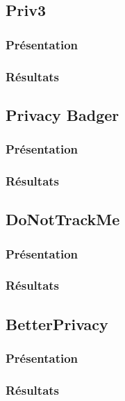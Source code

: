 \subsection{Priv3}
\subsubsection{Présentation}
\subsubsection{Résultats}

\subsection{Privacy Badger}
\subsubsection{Présentation}
\subsubsection{Résultats}

\subsection{DoNotTrackMe}
\subsubsection{Présentation}
\subsubsection{Résultats}

\subsection{BetterPrivacy}
\subsubsection{Présentation}
\subsubsection{Résultats}

